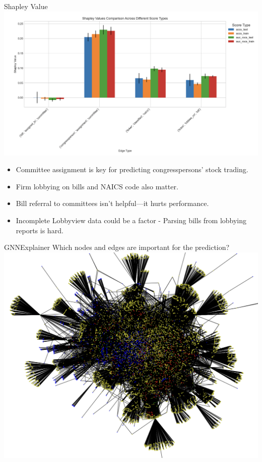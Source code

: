 \documentclass{beamer}
\begin{document}
	\begin{frame}{Shapley Value}
		\centering	\includegraphics[scale=0.21]{./images/shap.png}

		\begin{itemize}
			\item Committee assignment is key for predicting congresspersons' stock trading.
			\item Firm lobbying on bills and NAICS code also matter.
			\item Bill referral to committees isn't helpful—it hurts performance.
			\item Incomplete Lobbyview data could be a factor - Parsing bills from lobbying reports is hard.
		\end{itemize}
	\end{frame}

	\begin{frame}{GNNExplainer}
		Which nodes and edges are important for the prediction?
		\centering	\includegraphics[scale=0.3]{./images/graph.png}
	\end{frame}
\end{document}
